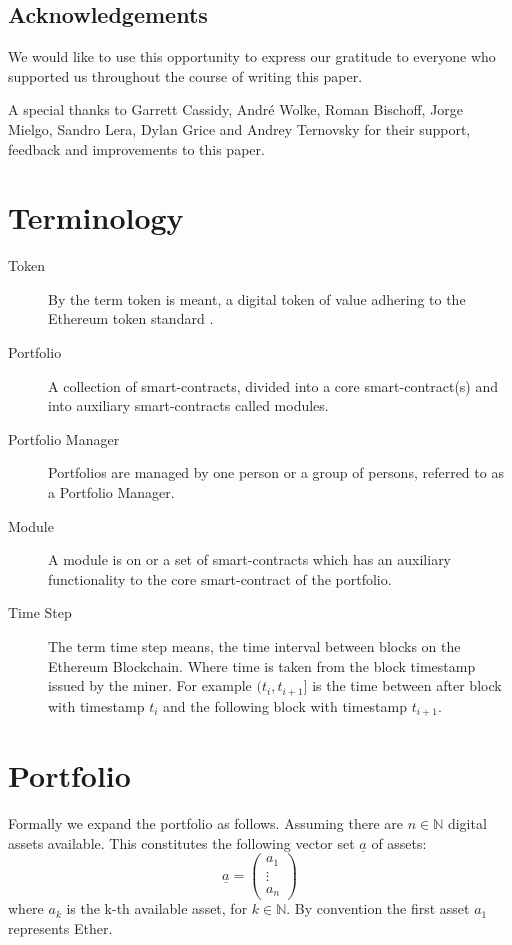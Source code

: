 \documentclass[9pt,oneside]{amsart}
\theoremstyle{plain}
\begin{document}
\begin{multicols}{2}
\section{Acknowledgements}

We would like to use this opportunity to express our gratitude to everyone who supported us throughout the course of writing this paper.

A special thanks to Garrett Cassidy, André Wolke, Roman Bischoff, Jorge Mielgo, Sandro Lera, Dylan Grice and Andrey Ternovsky for their support, feedback and improvements to this paper.



\end{multicols}

\appendix

\section{Terminology}\label{app:term}

\begin{description}
\item[Token] By the term token is meant, a digital token of value adhering to the Ethereum token standard \cite{tokenstandard}.
\item[Portfolio] A collection of smart-contracts, divided into a core smart-contract(s) and into auxiliary smart-contracts called modules.
\item[Portfolio Manager] Portfolios are managed by one person or a group of persons, referred to as a Portfolio Manager.
\item[Module] A module is on or a set of smart-contracts which has an auxiliary functionality to the core smart-contract of the portfolio.
\item[Time Step] The term time step means, the time interval between blocks on the Ethereum Blockchain. Where time is taken from the block timestamp issued by the miner. For example $(t_i, t_{i+1}]$ is the time between after block with timestamp $t_i$ and the following block with timestamp $t_{i+1}$.
	
\end{description}

\section{Portfolio}\label{app:defportfolio}

Formally we expand the portfolio as follows. Assuming there are $n \in \mathbb{N}$ digital assets available. This constitutes the following vector set $\underline{a}$ of assets:
\begin{equation}
	\underline{a} = \begin{pmatrix}a_{1}\\ \vdots \\ a_{n}\end{pmatrix}
\end{equation}
where $a_k$ is the k-th available asset, for $k \in \mathbb{N}$.
By convention the first asset $a_1$ represents Ether.
\end{document}
